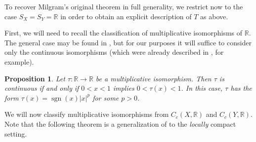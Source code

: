 \documentclass[letter,11pt]{amsart}
\theoremstyle{plain}		\newtheorem{theorem}[generalnumbering]{Theorem}
\theoremstyle{plain}		\newtheorem{corollary}[generalnumbering]{Corollary}
\theoremstyle{definition}		\newtheorem{definition}[generalnumbering]{Definition}
\theoremstyle{definition}		\newtheorem{example}[generalnumbering]{Example}
\theoremstyle{plain}		\newtheorem{proposition}[generalnumbering]{Proposition}
\theoremstyle{plain}		\newtheorem{lemma}[generalnumbering]{Lemma}
\theoremstyle{definition}
\begin{document}
To recover Milgram's original theorem in full generality, we restrict now to the case $S_X=S_Y=\mathbb{R}$ in order to obtain an explicit description of $T$ as above.

First, we will need to recall the classification of multiplicative isomorphisms of $\mathbb{R}$. The general case may be found in \cite[Theorem 3.1.3]{MR2467621}, but for our purposes it will suffice to consider only the continuous isomorphisms (which were already described in \cite[Lemma 4.3]{MR0029476}, for example).

\begin{proposition}\label{theoremclassificationmultiplicativeisomorphismsofr}
	Let $\tau\colon\mathbb{R}\to\mathbb{R}$ be a multiplicative isomorphism. Then $\tau$ is continuous if and only if $0<x<1$ implies $0<\tau(x)<1$. In this case, $\tau$ has the form $\tau(x)=\operatorname{sgn}(x)|x|^p$ for some $p>0$.
\end{proposition}

We will now classify multiplicative isomorphisms from $C_c(X,\mathbb{R})$ and $C_c(Y,\mathbb{R})$. Note that the following theorem is a generalization of \cite[Theorem A]{MR0029476} to the \emph{locally} compact setting.
\end{document}
